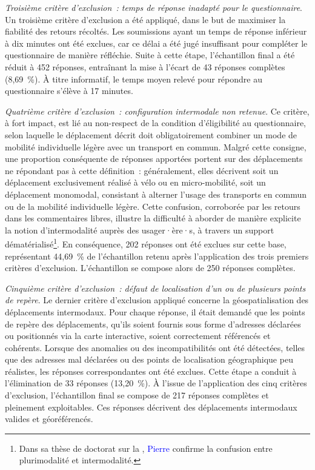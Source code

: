 \begin{refsegment}
\textsl{Troisième critère d'exclusion~: temps de réponse inadapté pour le questionnaire}. Un troisième critère d’exclusion a été appliqué, dans le but de maximiser la fiabilité des retours récoltés. Les soumissions ayant un temps de réponse inférieur à dix minutes ont été exclues, car ce délai a été jugé insuffisant pour compléter le questionnaire de manière réfléchie. Suite à cette étape, l’échantillon final a été réduit à 452 réponses, entraînant la mise à l'écart de 43 réponses complètes (8,69~\%). À titre informatif, le temps moyen relevé pour répondre au questionnaire s'élève à 17 minutes.%

\textsl{Quatrième critère d'exclusion~: configuration intermodale non retenue}. Ce critère, à fort impact, est lié au non-respect de la condition d’éligibilité au questionnaire, selon laquelle le déplacement décrit doit obligatoirement combiner un mode de mobilité individuelle légère avec un transport en commun. Malgré cette consigne, une proportion conséquente de réponses apportées portent sur des déplacements ne répondant pas à cette définition~: généralement, elles décrivent soit un déplacement exclusivement réalisé à vélo ou en micro-mobilité, soit un déplacement monomodal, consistant à alterner l'usage des transports en commun ou de la mobilité individuelle légère. Cette confusion, corroborée par les retours dans les commentaires libres, illustre la difficulté à aborder de manière explicite la notion d’intermodalité auprès des usager·ère·s, à travers un support dématérialisé\footnote{
    Dans sa thèse de doctorat sur la , \textcolor{blue}{Pierre} \textcolor{blue}{\textcite[41]{ageron_intermodalite-voyageurs_2013}} confirme la confusion entre plurimodalité et intermodalité.
}. En conséquence, 202 réponses ont été exclues sur cette base, représentant 44,69~\% de l’échantillon retenu après l’application des trois premiers critères d’exclusion. L’échantillon se compose alors de 250 réponses complètes.%

\textsl{Cinquième critère d'exclusion~: défaut de localisation d'un ou de plusieurs points de repère}. Le dernier critère d’exclusion appliqué concerne la géospatialisation des déplacements intermodaux. Pour chaque réponse, il était demandé que les points de repère des déplacements, qu’ils soient fournis sous forme d’adresses déclarées ou positionnés via la carte interactive, soient correctement référencés et cohérents. Lorsque des anomalies ou des incompatibilités ont été détectées, telles que des adresses mal déclarées ou des points de localisation géographique peu réalistes, les réponses correspondantes ont été exclues. Cette étape a conduit à l’élimination de 33 réponses (13,20~\%). À l’issue de l’application des cinq critères d’exclusion, l’échantillon final se compose de 217 réponses complètes et pleinement exploitables. Ces réponses décrivent des déplacements intermodaux valides et géoréférencés.%


\end{refsegment}

